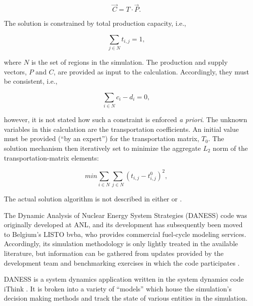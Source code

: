 \begin{equation*}
\vec{C} = T \cdot \vec{P}.
\end{equation*}

The solution is constrained by total production capacity, i.e., 

\begin{equation*}
\sum_{j \in N} t_{i,j} = 1,
\end{equation*}

where $N$ is the set of regions in the simulation. The production and supply
vectors, $P$ and $C$, are provided as input to the calculation. Accordingly,
they must be consistent, i.e.,

\begin{equation*}
\sum_{i \in N} c_i - d_i = 0,
\end{equation*}

however, it is not stated how such a constraint is enforced \textit{a
  priori}. The unknown variables in this calculation are the transportation
coefficients. An initial value must be provided (``by an expert'') for the
transportation matrix, $T_0$. The solution mechanism then iteratively set to
minimize the aggregate $L_2$ norm of the transportation-matrix elements:

\begin{equation*}
min \sum_{i \in N} \sum_{j \in N} \left( t_{i,j} - t_{i,j}^0 \right)^2,
\end{equation*}

The actual solution algorithm is not described in either
\cite{iaea_nuclear_2010} or \cite{andrianova_desae_2008}.

The Dynamic Analysis of Nuclear Energy System Strategies (DANESS) code was
originally developed at ANL, and its development has subsequently been moved to
Belgium's LISTO bvba, who provides commercial fuel-cycle modeling
services. Accordingly, its simulation methodology is only lightly treated in the
available literature, but information can be gathered from updates provided by
the development team \cite{van_den_durpel_daness_2009} and benchmarking
exercises in which the code participates \cite{guerin_benchmark_2009}. 

DANESS is a system dynamics application written in the system dynamics code
iThink \cite{richmond_ithink_2004}. It is broken into a variety of ``models''
which house the simulation's decision making methods and track the state of
various entities in the simulation. 


